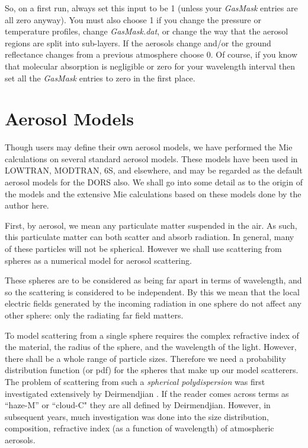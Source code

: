 \documentclass[12pt]{article}
\begin{document}
So, on  a first run, always set this input to be 1 (unless your {\it GasMask} entries are all zero anyway).
 You must also choose 1 if you change the pressure or
temperature profiles, change {\it GasMask.dat}, or change the way that the aerosol regions are
split into sub-layers. If the aerosols change and/or the ground reflectance changes from a previous atmosphere
 choose 0. Of course, if you know that molecular absorption is negligible
 or zero for your wavelength interval then set all the {\it GasMask} entries to zero in the first place.

\section{Aerosol Models}

Though users may define their own aerosol models, we have performed the Mie calculations on several standard 
aerosol models. These models have been used in LOWTRAN,  MODTRAN, 6S, and elsewhere, and may be regarded as
 the default aerosol models for the DORS also. We shall go into some detail as to the origin of the 
models and the extensive
 Mie calculations based on these models done by the author here.

First, by aerosol, we mean any particulate matter suspended in the air. As such, this particulate matter can
both scatter and absorb radiation. In general, many of these particles will not be spherical. 
However we shall use scattering from spheres as 
a numerical model for aerosol scattering. 

These spheres are to be 
considered as being far apart in terms of wavelength, and so the scattering is considered to be independent. By
this we mean that the local electric fields generated by the incoming radiation in one sphere do not affect
any other sphere: only the radiating far field matters.

To model scattering from a single sphere requires the complex refractive index of the material, the radius of
the sphere, and the wavelength of the light. However, there shall be a whole range of particle sizes. Therefore
we need a probability distribution function (or pdf) for the spheres that make up our model scatterers.
The problem of scattering from such a {\it spherical polydispersion} was first investigated extensively
by Deirmendjian \cite{Deirmendjian:Mybib}. If the reader comes across terms as ``haze-M'' or ``cloud-C" they are all defined by
Deirmendjian. However, in subsequent years, much investigation was done into the size distribution, composition, 
 refractive index (as a function of wavelength) of atmospheric aerosols.
\end{document}
